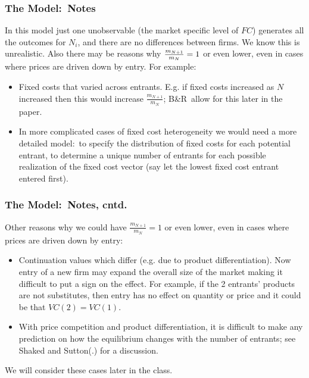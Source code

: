 \begin{frame}%

\frametitle{The Model:\ Notes}

In this model just one unobservable (the market specific level of $FC$)
generates all the outcomes for $N_{i}$, and there are no differences between
firms. We know this is unrealistic. Also there may be reasons why $\frac{%
m_{N+1}}{m_{N}}=1$ or even lower, even in cases where prices are driven down
by entry. For example:\ 

\begin{itemize}
\item Fixed costs that varied across entrants. E.g. if fixed costs increased
as $N$ increased then this would increase $\frac{m_{N+1}}{m_{N}}$; B\&R\
allow for this later in the paper.

\item In more complicated cases of fixed cost heterogeneity we would need a
more detailed model:\ to specify the distribution of fixed costs for each
potential entrant, to determine a unique number of entrants for each
possible realization of the fixed cost vector (say let the lowest fixed cost
entrant entered first).
\end{itemize}

\end{frame}%

\begin{frame}%

\frametitle{The Model:\ Notes, cntd.}

Other reasons why we could have $\frac{m_{N+1}}{m_{N}}=1$ or even lower,
even in cases where prices are driven down by entry:

\begin{itemize}
\item Continuation values which differ (e.g. due to product
differentiation). Now entry of a new firm may expand the overall size of the
market making it difficult to put a sign on the effect. For example, if the
2 entrants' products are not substitutes, then entry has no effect on
quantity or price and it could be that $VC(2)=VC(1)$.

\item With price competition and product differentiation, it is difficult to
make any prediction on how the equilibrium changes with the number of
entrants; see Shaked and Sutton(.) for a discussion.
\end{itemize}

We will consider these cases later in the class.

\end{frame}%

